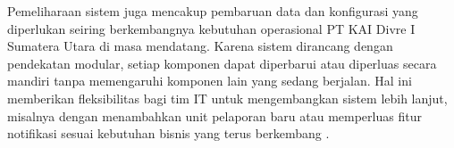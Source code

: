 Pemeliharaan sistem juga mencakup pembaruan data dan konfigurasi yang diperlukan seiring berkembangnya kebutuhan operasional PT KAI Divre I Sumatera Utara di masa mendatang. Karena sistem dirancang dengan pendekatan modular, setiap komponen dapat diperbarui atau diperluas secara mandiri tanpa memengaruhi komponen lain yang sedang berjalan. Hal ini memberikan fleksibilitas bagi tim IT untuk mengembangkan sistem lebih lanjut, misalnya dengan menambahkan unit pelaporan baru atau memperluas fitur notifikasi sesuai kebutuhan bisnis yang terus berkembang \cite{prasnowo2024waterfall}. \par
